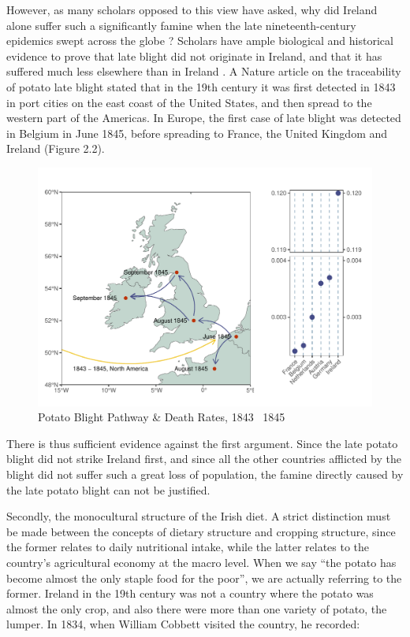 However, as many scholars opposed to this view have asked, why did Ireland alone suffer such a significantly famine when the late nineteenth-century epidemics swept across the globe \citep{oleksy46irish, mokyr2013ireland, solar2015ireland, kelly2015ireland, gray2006famine}? Scholars have ample biological and historical evidence to prove that late blight did not originate in Ireland, and that it has suffered much less elsewhere than in Ireland \citep{zadoks2008potato}. A Nature article \citep{bourke1964emergence} on the traceability of potato late blight stated that in the 19th century it was first detected in 1843 in port cities on the east coast of the United States, and then spread to the western part of the Americas. In Europe, the first case of late blight was detected in Belgium in June 1845, before spreading to France, the United Kingdom and Ireland (Figure 2.2).

\begin{figure}[htbp]
    \centering
    \caption{Potato Blight Pathway \& Death Rates, 1843 \textendash\ 1845}
    \includegraphics[width=.95\textwidth]{../03_outputs/blight_path_death.pdf}
\end{figure}

There is thus sufficient evidence against the first argument. Since the late potato blight did not strike Ireland first, and since all the other countries afflicted by the blight did not suffer such a great loss of population, the famine directly caused by the late potato blight can not be justified.

Secondly, the monocultural structure of the Irish diet. A strict distinction must be made between the concepts of dietary structure and cropping structure, since the former relates to daily nutritional intake, while the latter relates to the country's agricultural economy at the macro level. When we say “the potato has become almost the only staple food for the poor”, we are actually referring to the former. Ireland in the 19th century was not a country where the potato was almost the only crop, and also there were more than one variety of potato, the lumper. In 1834, when William Cobbett visited the country, he recorded: 

